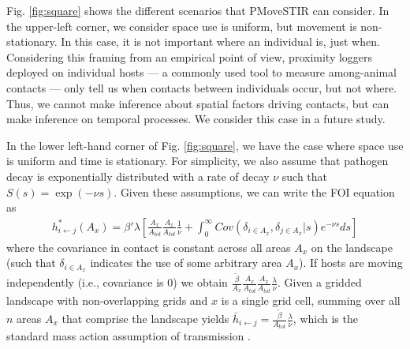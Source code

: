 \documentclass[letterpaper]{article}
\begin{document}
Fig. \ref{fig:square} shows the different scenarios that PMoveSTIR can consider. In the upper-left corner, we consider space use is uniform, but movement is non-stationary. In this case, it is not important where an individual is, just when. Considering this framing from an empirical point of view, proximity loggers deployed on individual hosts --- a commonly used tool to measure among-animal contacts \citep{Drewe2012} --- only tell us when contacts between individuals occur, but not where.  Thus, we cannot make inference about spatial factors driving contacts, but can make inference on temporal processes.  We consider this case in a future study.

In the lower left-hand corner of Fig. \ref{fig:square}, we have the case where space use is uniform and time is stationary. For simplicity, we also assume that pathogen decay is exponentially distributed with a rate of decay $\nu$ such that $S(s) = \exp(-\nu s)$. Given these assumptions, we can write the FOI equation as
\begin{equation}
    \begin{aligned}
        h^*_{i \leftarrow j}(A_x) = \beta' \lambda \left[\frac{A_x}{A_{tot}}\frac{A_x}{A_{tot}} \frac{1}{\nu} +  \int_{0}^{\infty} Cov(\delta_{i \in A_x}, \delta_{j \in A_x} | s) e^{-\nu s} ds\right]
    \end{aligned}
    \label{eq:uniform_stationary1}
\end{equation}
where the covariance in contact is constant across all areas $A_x$ on the landscape (such that $\delta_{i \in A_x}$ indicates the use of some arbitrary area $A_x$).  
If hosts are moving independently (i.e., covariance is 0) we obtain $\frac{\tilde{\beta}}{A_x} \frac{A_x}{A_{tot}} \frac{A_x}{A_{tot}}  \frac{\lambda}{\nu}$. Given a gridded landscape with non-overlapping grids and $x$ is a single grid cell, summing over all $n$ areas $A_x$ that comprise the landscape yields $\bar{h}_{i \leftarrow j} =\frac{\tilde{\beta}}{A_\text{tot}} \frac{\lambda}{\nu}$, which is the standard mass action assumption of transmission \citep{McCallum2001}. 
\end{document}
